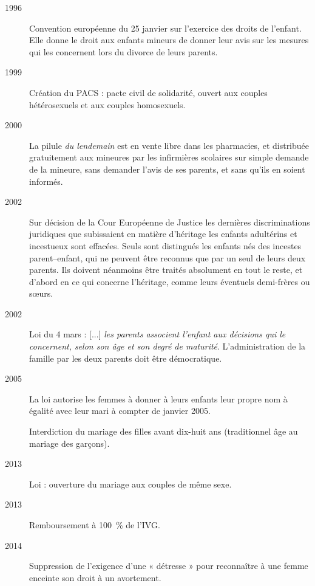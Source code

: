\begin{description}
\item[1996] Convention européenne du 25 janvier sur l'exercice des droits de l'enfant. Elle donne le droit aux enfants mineurs de donner leur avis sur les mesures qui les concernent lors du divorce de leurs parents.

\item[1999] Création du PACS : pacte civil de solidarité, ouvert aux couples hétérosexuels et aux couples homosexuels.

\item[2000] La pilule {\emph{du lendemain}} est en vente libre dans les pharmacies, et distribuée gratuitement aux mineures par les infirmières scolaires sur simple demande de la mineure, sans demander l'avis de ses parents, et sans qu'ils en soient informés.

\item[2002] Sur décision de la Cour Européenne de Justice les dernières discriminations juridiques que subissaient en matière d'héritage les enfants adultérins et incestueux sont effacées. Seuls sont distingués les enfants nés des incestes parent--enfant, qui ne peuvent être reconnus que par un seul de leurs deux parents. Ils doivent néanmoins être traités absolument en tout le reste, et d'abord en ce qui concerne l'héritage, comme leurs éventuels demi-frères ou sœurs. 

\item[2002] 
Loi du 4 mars : {[...] \emph{les parents associent l'enfant aux décisions qui le concernent, selon son âge et son degré de maturité}}. L'administration de la famille par les deux parents doit être démocratique.

\item[2005] La loi autorise les femmes à donner à leurs enfants leur propre nom à égalité avec leur mari à compter de janvier 2005. 

Interdiction du mariage des filles avant dix-huit ans (traditionnel âge au mariage des garçons).

\item[2013] Loi  : ouverture du mariage aux couples de même sexe.

\item[2013] Remboursement à 100~\% de l'IVG.

\item[2014] Suppression de l'exigence d'une « détresse » pour reconnaître à une femme enceinte son droit à un avortement. 
\end{description}
 
